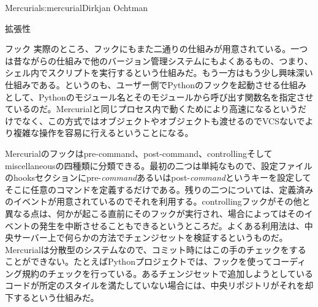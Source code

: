 \begin{aosachapter}{Mercurial}{s:mercurial}{Dirkjan Ochtman}
\begin{aosasect1}{拡張性}
\begin{aosasect2}{フック}
実際のところ、フックにもまた二通りの仕組みが用意されている。一つは昔ながらの仕組みで他のバージョン管理システムにもよくあるもの、つまり、シェル内でスクリプトを実行するという仕組みだ。もう一方はもう少し興味深い仕組みである。というのも、ユーザー側でPythonのフックを起動させる仕組みとして、Pythonのモジュール名とそのモジュールから呼び出す関数名を指定させているのだ。Mercurialと同じプロセス内で動くためにより高速になるというだけでなく、この方式ではオブジェクトやオブジェクトも渡せるのでVCSないでより複雑な操作を容易に行えるということになる。

Mercurialのフックはpre-command、post-command、controllingそしてmiscellaneousの四種類に分類できる。最初の二つは単純なもので、設定ファイルのhooksセクションにpre-\emph{command}あるいはpost-\emph{command}というキーを設定してそこに任意のコマンドを定義するだけである。残りの二つについては、定義済みのイベントが用意されているのでそれを利用する。controllingフックがその他と異なる点は、何かが起こる直前にそのフックが実行され、場合によってはそのイベントの発生を中断させることもできるというところだ。よくある利用法は、中央サーバー上で何らかの方法でチェンジセットを検証するというものだ。Mercurialは分散型のシステムなので、コミット時にはこの手のチェックをすることができない。たとえばPythonプロジェクトでは、フックを使ってコーディング規約のチェックを行っている。あるチェンジセットで追加しようとしているコードが所定のスタイルを満たしていない場合には、中央リポジトリがそれを却下するという仕組みだ。


\end{aosasect2}
\end{aosasect1}
\end{aosachapter}
